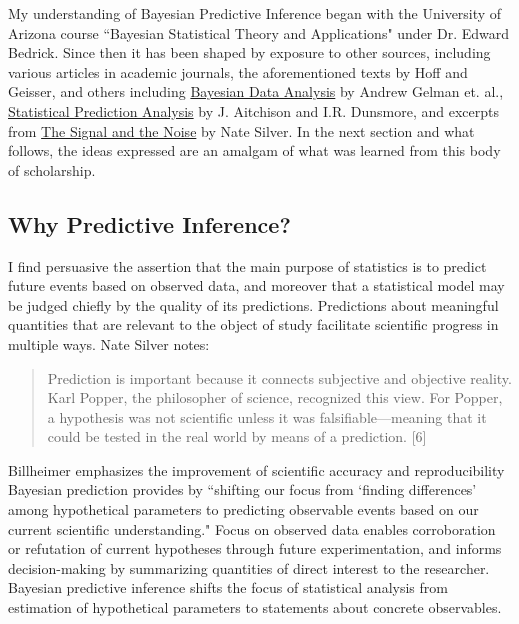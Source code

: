 \documentclass[12pt, a4paper]{article}
\begin{document}
My understanding of Bayesian Predictive Inference began with the University of Arizona course ``Bayesian Statistical Theory and Applications" under Dr. Edward Bedrick.  Since then it has been shaped by exposure to other sources, including various articles in academic journals, the aforementioned texts by Hoff and Geisser, and others including \underline{Bayesian Data Analysis} by Andrew Gelman et. al., \underline{Statistical Prediction Analysis} by J. Aitchison and I.R. Dunsmore, and excerpts from \underline{The Signal and the Noise} by Nate Silver.  In the next section and what follows, the ideas expressed are an amalgam of what was learned from this body of scholarship.

  \subsection{Why Predictive Inference?}


I find persuasive the assertion that the main purpose of statistics is to predict future events based on observed data, and moreover that a statistical model may be judged chiefly by the quality of its predictions.  Predictions about meaningful quantities that are relevant to the object of study facilitate scientific progress in multiple ways.  Nate Silver notes:

\begin{quote}
Prediction is important because it connects subjective and objective reality. Karl Popper, the philosopher of science, recognized this view. For Popper, a hypothesis was not scientific unless it was falsifiable—meaning that it could be tested in the real world by means of a prediction. [6]
\end{quote}

\noindent Billheimer emphasizes the improvement of scientific accuracy and reproducibility Bayesian prediction provides by ``shifting our focus from `finding differences' among hypothetical parameters to predicting observable events based on our current scientific understanding." Focus on observed data enables corroboration or refutation of current hypotheses through future experimentation, and informs decision-making by summarizing quantities of direct interest to the researcher.  Bayesian predictive inference shifts the focus of statistical analysis from estimation of hypothetical parameters to statements about concrete observables.\\
\end{document}
